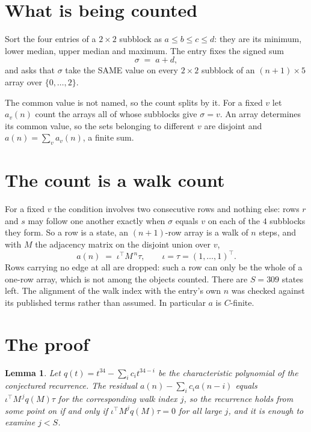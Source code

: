 \documentclass[11pt,a4paper]{article}
\theoremstyle{plain}
\newtheorem{lemma}[theorem]{Lemma}
\theoremstyle{definition}
\begin{document}
\section{What is being counted}

Sort the four entries of a $2\times2$ subblock as $a\le b\le c\le d$: they
are its minimum, lower median, upper median and maximum. The entry fixes the signed sum
\[
\sigma\;=\;a+d,
\]
and asks that $\sigma$ take the SAME value on every $2\times2$ subblock of an
$(n+1)\times5$ array over $\{0,\dots,2\}$.

The common value is not named, so the count splits by it. For a fixed $v$ let $a_v(n)$ count
the arrays all of whose subblocks give $\sigma=v$. An array determines its common value, so
the sets belonging to different $v$ are disjoint and $a(n)=\sum_v a_v(n)$, a finite sum.


\section{The count is a walk count}

For a fixed $v$ the condition involves two consecutive rows and nothing
else: rows $r$ and $s$ may follow one another exactly when $\sigma$ equals $v$ on each of the
$4$ subblocks they form. So a row is a state, an $(n+1)$-row array is a walk of $n$
steps, and with $M$ the adjacency matrix on the disjoint union over $v$,
\[
a(n)\;=\;\iota^{\!\top}M^{\,n}\tau,\qquad\iota=\tau=(1,\dots,1)^{\!\top} .
\]
Rows carrying no edge at all are dropped: such a row can only be the whole of a one-row
array, which is not among the objects counted. There are $S=309$ states left.
The alignment of the walk index with the entry's own $n$ was checked against its published
terms rather than assumed. In particular $a$ is $C$-finite.

\section{The proof}

\begin{lemma}\label{lem:crit}
Let $q(t)=t^{34}-\sum_i c_it^{34-i}$ be the characteristic polynomial of the
conjectured recurrence. The residual $a(n)-\sum_ic_ia(n-i)$ equals
$\iota^{\!\top}M^{\,j}q(M)\tau$ for the corresponding walk index $j$, so the recurrence
holds from some point on if and only if $\iota^{\!\top}M^{j}q(M)\tau=0$ for all large $j$,
and it is enough to examine $j<S$.
\end{lemma}
\end{document}
